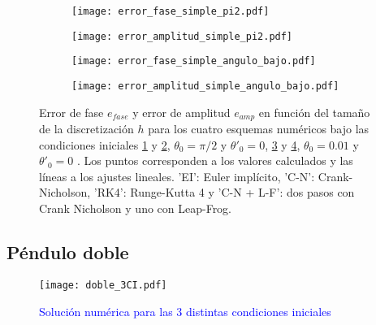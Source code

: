 \documentclass[aps,prb,twocolumn,superscriptaddress,floatfix,longbibliography]{revtex4-2}
\newcounter{para}
\begin{document}
\begin{figure}
  \centering
  \begin{subfigure}[b]{0.45\textwidth}
      \centering
      \texttt{[image: error\_fase\_simple\_pi2.pdf]}
      \caption{\label{fig:error_fase_simple_pi2}}
  \end{subfigure}
  \hfill
  \begin{subfigure}[b]{0.45\textwidth}
      \centering
      \texttt{[image: error\_amplitud\_simple\_pi2.pdf]}
      \caption{\label{fig:error_amplitud_simple_pi2}}
  \end{subfigure}
  \hfill
  \begin{subfigure}[b]{0.45\textwidth}
      \centering
      \texttt{[image: error\_fase\_simple\_angulo\_bajo.pdf]}
      \caption{\label{fig:error_fase_simple_angulo_bajo}}
  \end{subfigure}
  \hfill
  \begin{subfigure}[b]{0.45\textwidth}
      \centering
      \texttt{[image: error\_amplitud\_simple\_angulo\_bajo.pdf]}
      \caption{\label{fig:error_amplitud_simple_angulo_bajo}}
  \end{subfigure}
     \caption{Error de fase $e_{fase}$ y error de amplitud $e_{amp}$ en función del tamaño de la discretización $h$ para los cuatro esquemas numéricos bajo las condiciones iniciales \ref{fig:error_fase_simple_pi2} y \ref{fig:error_amplitud_simple_pi2}, $\theta_0 = \pi/2$ y $\theta'_0 = 0$, \ref{fig:error_fase_simple_angulo_bajo} y \ref{fig:error_amplitud_simple_angulo_bajo}, $\theta_0 = 0.01$ y $\theta'_0 = 0$ . Los puntos corresponden a los valores calculados y las líneas a los ajustes lineales. 'EI': Euler implícito, 'C-N': Crank-Nicholson, 'RK4': Runge-Kutta 4 y 'C-N + L-F': dos pasos con Crank Nicholson y uno con Leap-Frog.}
     \label{fig:simple_error_vs_h}
\end{figure}




\twocolumngrid






\subsection{Péndulo doble}

\begin{figure}[h]
  \texttt{[image: doble\_3CI.pdf]}
  \caption{\textcolor{blue}{Solución numérica para las 3 distintas condiciones iniciales}}
   \label{fig:doble_3CI}
\end{figure}
\end{document}
